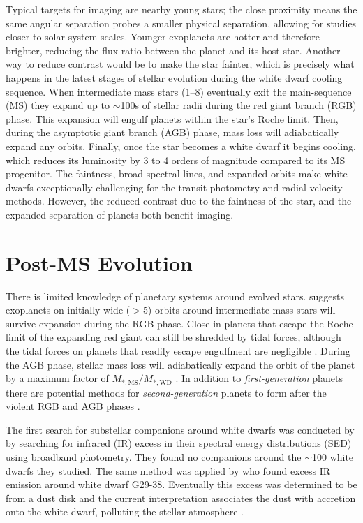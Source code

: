\documentclass[twocolumn]{aastex631}
\begin{document}
Typical targets for imaging are nearby young stars; the close proximity means the same angular separation probes a smaller physical separation, allowing for studies closer to solar-system scales. Younger exoplanets are hotter and therefore brighter, reducing the flux ratio between the planet and its host star. Another way to reduce contrast would be to make the star fainter, which is precisely what happens in the latest stages of stellar evolution during the white dwarf cooling sequence. When intermediate mass stars (\qtyrange{1}{8}{\solarmass}) eventually exit the main-sequence (MS) they expand up to $\sim$100s of stellar radii during the red giant branch (RGB) phase. This expansion will engulf planets within the star's Roche limit. Then, during the asymptotic giant branch (AGB) phase, mass loss will adiabatically expand any orbits. Finally, once the star becomes a white dwarf it begins cooling, which reduces its luminosity by 3 to 4 orders of magnitude compared to its MS progenitor. The faintness, broad spectral lines, and expanded orbits make white dwarfs exceptionally challenging for the transit photometry and radial velocity methods. However, the reduced contrast due to the faintness of the star, and the expanded separation of planets both benefit imaging.

\section{Post-MS Evolution}

There is limited knowledge of planetary systems around evolved stars. \citet{burleigh_imaging_2002,veras_post-main-sequence_2016} suggests exoplanets on initially wide ($>$\qty{5}{\au}) orbits around intermediate mass stars will survive expansion during the RGB phase. Close-in planets that escape the Roche limit of the expanding red giant can still be shredded by tidal forces, although the tidal forces on planets that readily escape engulfment are negligible \citep{nordhaus_orbits_2013}. During the AGB phase, stellar mass loss will adiabatically expand the orbit of the planet by a maximum factor of $M_{*,\mathrm{MS}}/M_{*,\mathrm{WD}}$ \citep{jeans_cosmogonic_1924}. In addition to \textit{first-generation} planets there are potential methods for \textit{second-generation} planets to form after the violent RGB and AGB phases \citep{perets_second_2010}.

The first search for substellar companions around white dwarfs was conducted by \citet{probst_infrared_1983} by searching for infrared (IR) excess in their spectral energy distributions (SED) using broadband photometry. They found no companions around the $\sim$100 white dwarfs they studied. The same method was applied by \citet{zuckerman_excess_1987} who found excess IR emission around white dwarf G29-38. Eventually this excess was determined to be from a dust disk \citep{telesco_observations_1990} and the current interpretation associates the dust with accretion onto the white dwarf, polluting the stellar atmosphere \citep{koester_metals_1997}.
\end{document}
